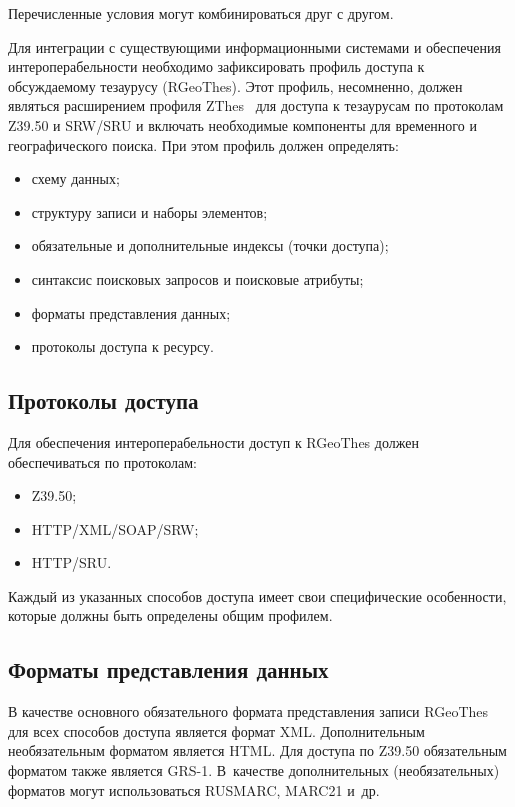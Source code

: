 \begin{multicols}{2}
  Перечисленные условия могут комбинироваться друг с другом. 
  
  Для интеграции с существующими информационными системами и обеспечения 
интероперабельности необходимо зафиксировать профиль доступа к обсуждаемому 
тезаурусу ({RGeoThes}). Этот профиль, несомненно, должен являться расширением 
профиля {ZThes}~\cite{4-sk} для доступа к тезаурусам по протоколам Z39.50 и 
{SRW/SRU} и включать необходимые компоненты для временного и географического 
поиска. При этом профиль должен определять:
  \begin{itemize}
\item схему данных;
\item структуру записи и наборы элементов;
\item обязательные и дополнительные индексы (точки доступа);
\item синтаксис поисковых запросов и поисковые атрибуты;
\item форматы представления данных;
\item протоколы доступа к ресурсу.
\end{itemize}

  \subsection{Протоколы доступа}
  
  Для обеспечения интероперабельности доступ к \mbox{RGeoThes} должен обеспечиваться 
по протоколам:
  \begin{itemize}
\item Z39.50;
\item HTTP/XML/SOAP/SRW;
\item HTTP/SRU.
\end{itemize}

  Каждый из указанных способов доступа имеет свои специфические особенности, которые 
должны быть определены общим профилем.
  
  \subsection{Форматы представления данных}
  
  В качестве основного обязательного формата представления записи \mbox{RGeoThes} для 
всех способов доступа является формат {XML}. Дополнительным необязательным 
форматом является {HTML}. Для доступа по Z39.50 обязательным форматом 
также является GRS-1. В~качестве дополнительных (необязательных) форматов могут 
использоваться \mbox{RUSMARC}, {MARC}21 и~др.
  

\end{multicols}
